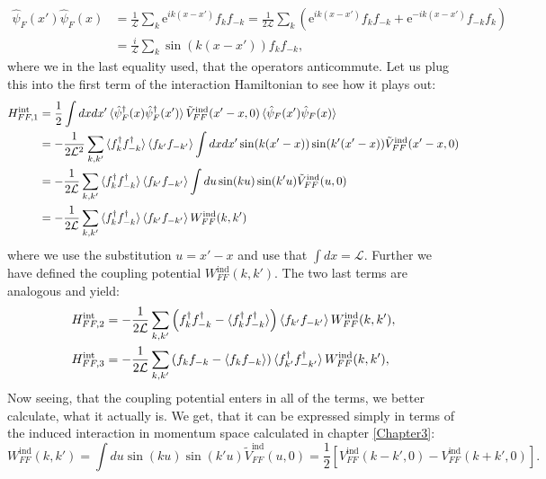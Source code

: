 \begin{align}
\hat{\psi}_F(x') \hat{\psi}_F(x) &= \frac{1}{\mathcal{L}}\sum_{k} \text{e}^{ik(x-x')}f_kf_{-k} = \frac{1}{2\mathcal{L}}\sum_{k} \left(\text{e}^{ik(x-x')}f_{k}f_{-k}+\text{e}^{-ik(x-x')}f_{-k}f_{k}\right) \nonumber \\
&= \frac{i}{\mathcal{L}}\sum_{k} \sin(k(x-x'))f_{k}f_{-k}, 
\label{eq.correlation}
\end{align}
where we in the last equality used, that the operators anticommute. Let us plug this into the first term of the interaction Hamiltonian to see how it plays out: 
\begin{align}
H^\text{int}_{FF,1} &= \frac{1}{2}\int dxdx' \braket {\hat{\psi}^\dagger_F(x) \hat{\psi}^\dagger_F(x')} \tilde{V}^\text{ind}_{FF}(x'-x,0) \braket {\hat{\psi}_F(x') \hat{\psi}_F(x)} \nonumber \\
&= - \frac{1}{2\mathcal{L}^2}\sum_{k,k'} \braket {f^\dagger_{k}f^\dagger_{-k} } \braket {f_{k'}f_{-k'}} \int dx dx' \sin(k(x'-x))\sin(k'(x'-x))\tilde{V}^\text{ind}_{FF}(x'-x,0) \nonumber \\
&= - \frac{1}{2\mathcal{L}}\sum_{k,k'} \braket {f^\dagger_{k}f^\dagger_{-k}} \braket{f_{k'}f_{-k'}} \int du \sin(ku)\sin(k'u)\tilde{V}^\text{ind}_{FF}(u,0) \nonumber \\
&= - \frac{1}{2\mathcal{L}}\sum_{k,k'} \braket {f^\dagger_{k}f^\dagger_{-k}} \braket {f_{k'}f_{-k'}} W^\text{ind}_{FF}(k,k')
\end{align}
where we use the substitution $u = x'-x$ and use that $\int dx = \mathcal{L}$. Further we have defined the coupling potential $W^\text{ind}_{FF}(k,k')$. The two last terms are analogous and yield:
\begin{align}
H^\text{int}_{FF,2} &= - \frac{1}{2\mathcal{L}}\sum_{k,k'}\left(f^\dagger_k f^\dagger_{-k} - \braket {f^\dagger_k f^\dagger_{-k}}\right) \braket {f_{k'}f_{-k'}} W^\text{ind}_{FF}(k,k'), \nonumber \\
H^\text{int}_{FF,3} &= - \frac{1}{2\mathcal{L}}\sum_{k,k'}\left(f_k f_{-k} - \braket{f_k f_{-k}} \right)\braket {f^\dagger_{k'}f^\dagger_{-k'} } W^\text{ind}_{FF}(k,k'), \nonumber
\end{align}
Now seeing, that the coupling potential enters in all of the terms, we better calculate, what it actually is. We get, that it can be expressed simply in terms of the induced interaction in momentum space calculated in chapter \ref{Chapter3}:
\begin{equation}
W^\text{ind}_{FF}(k,k') = \int du \sin(ku)\sin(k'u)\tilde{V}^\text{ind}_{FF}(u,0) = \frac{1}{2}\left[V^\text{ind}_{FF}(k-k',0) - V^\text{ind}_{FF}(k+k',0)\right].
\label{eq.CouplingPotential}
\end{equation}

